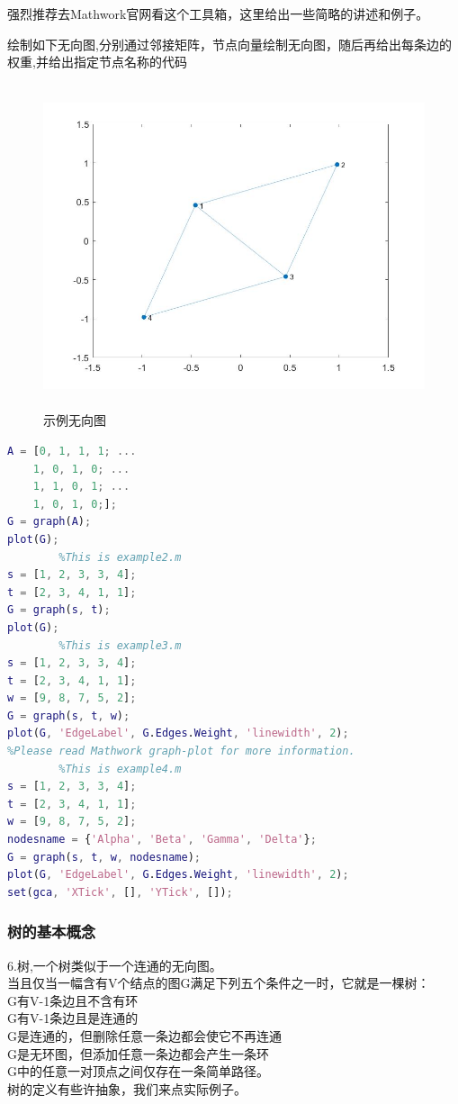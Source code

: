 \documentclass[a4paper,20pt]{article}
\begin{document}
\par \noindent 强烈推荐去Mathwork官网看这个工具箱，这里给出一些简略的讲述和例子。
\par 绘制如下无向图,分别通过邻接矩阵，节点向量绘制无向图，随后再给出每条边的权重,并给出指定节点名称的代码
\begin{figure}[H]
    \centering
    \includegraphics[width=340pt,height=270pt]{figure1.jpg}
    \caption{示例无向图}
\end{figure}
\begin{center}
    \begin{lstlisting}[caption={FirstExample.m},language=Matlab]
        %This is example1.m
A = [0, 1, 1, 1; ...
    1, 0, 1, 0; ...
    1, 1, 0, 1; ...
    1, 0, 1, 0;];
G = graph(A);
plot(G);
        %This is example2.m
s = [1, 2, 3, 3, 4];
t = [2, 3, 4, 1, 1];
G = graph(s, t);
plot(G);
        %This is example3.m
s = [1, 2, 3, 3, 4];
t = [2, 3, 4, 1, 1];
w = [9, 8, 7, 5, 2];
G = graph(s, t, w);
plot(G, 'EdgeLabel', G.Edges.Weight, 'linewidth', 2);  
%Please read Mathwork graph-plot for more information.
        %This is example4.m
s = [1, 2, 3, 3, 4];
t = [2, 3, 4, 1, 1];
w = [9, 8, 7, 5, 2];
nodesname = {'Alpha', 'Beta', 'Gamma', 'Delta'};
G = graph(s, t, w, nodesname);
plot(G, 'EdgeLabel', G.Edges.Weight, 'linewidth', 2); 
set(gca, 'XTick', [], 'YTick', []);

        \end{lstlisting}
\end{center}


\subsubsection{树的基本概念}
\par 6.树,一个树类似于一个连通的无向图。
\\当且仅当一幅含有V个结点的图G满足下列五个条件之一时，它就是一棵树：
\\G有V-1条边且不含有环
\\G有V-1条边且是连通的
\\G是连通的，但删除任意一条边都会使它不再连通
\\G是无环图，但添加任意一条边都会产生一条环
\\G中的任意一对顶点之间仅存在一条简单路径。
\\树的定义有些许抽象，我们来点实际例子。
\end{document}
